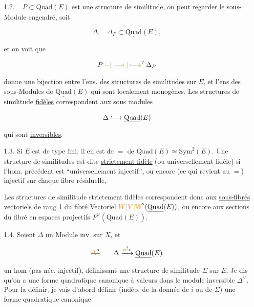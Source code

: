 1.2. \  $P\subset\underline{\mathrm{Quad}}(E)$ est une structure de similitude, on peut regarder le sous-Module engendré, soit

\[\Delta=\Delta_P\subset\underline{\mathrm{Quad}}(E),\]

et on voit que

\[P\mathrel{\unsure{-|\longrightarrow|\longmapsto}}\Delta_P\]

donne une bijection entre l'ens. des structures de similitudes sur $E$, et l'ens des sous-Modules de $\underline{\mathrm{Quad}}(E)$ qui sont localement monogènes. Les  structures  de similitude \uline{fidèles} correspondent aux sous modules

\[\Delta\lhook\joinrel\longrightarrow\underline{\mathrm{Quad}}(E)\]

qui sont \uline{inversibles}.


1.3. Si $E$ est   de type fini, il en  est de $=$ de $\underline{\mathrm{Quad}}(E)\simeq\underline{\mathrm{Sym}}^2(E)$. Une structure de similitudes est dite \uline{strictement fidèle} (ou universellement fidèle) si l'hom. précédent est ``universellement injectif'', ou encore (ce qui revient au $=$) injectif sur chaque fibre résiduelle,

Les structures de similitude strictement fidèles correspondent donc aux \uline{sous-fibrés vectoriels de rang 1} du fibré Vectoriel $\unsure{W|V|\mathbb W}(\underline{\mathrm{Quad}}(E))$, ou encore aux sections du fibré en espaces projectifs $P^\vee(\underline{\mathrm{Quad}}(E))$.

1.4. Soient $\Delta$ un Module inv. sur $X$, et

\[\deleted{\unsure{\Delta}}\qquad\Delta\xrightarrow{\deleted{\unsure{\alpha}}i}\underline{\mathrm{Quad}}(E)\]

un hom (pas néc. injectif), définissant  une structure de similitude $\Sigma$ sur $E$. Je dis qu'on a une forme quadratique  canonique à valeurs dans le module inversible $\Delta^\vee$. Pour la définir, je vais d'abord définir (indép. de la donnée de $i$ ou de $\Sigma$) une forme quadratique canonique

